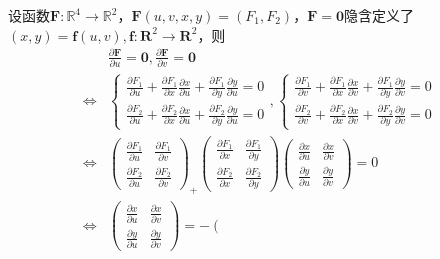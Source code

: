 \documentclass[main.tex]{subfiles}
\begin{document}
\begin{example}\label{exp:II.12.2}
设函数$\mathbf{F}:\mathbb{R}^4\rightarrow\mathbb{R}^2$，$\mathbf{F}\left(u,v,x,y\right)=\left(F_1,F_2\right)$，$\mathbf{F}=\mathbf{0}$隐含定义了$\left(x,y\right)=\mathbf{f}\left(u,v\right),\mathbf{f}:\mathbf{R}^2\rightarrow\mathbf{R}^2$，则
\begin{align*}
    &\frac{\partial \mathbf{F}}{\partial u}=\mathbf{0},\frac{\partial \mathbf{F}}{\partial v}=\mathbf{0}\\
    \Leftrightarrow&\left\{\begin{array}{l}
    \frac{\partial F_1}{\partial u}+\frac{\partial F_1}{\partial x}\frac{\partial x}{\partial u}+\frac{\partial F_1}{\partial y}\frac{\partial y}{\partial u}=0\\
    \frac{\partial F_2}{\partial u}+\frac{\partial F_2}{\partial x}\frac{\partial x}{\partial u}+\frac{\partial F_2}{\partial y}\frac{\partial y}{\partial u}=0
    \end{array}\right.,\left\{\begin{array}{l}
    \frac{\partial F_1}{\partial v}+\frac{\partial F_1}{\partial x}\frac{\partial x}{\partial v}+\frac{\partial F_1}{\partial y}\frac{\partial y}{\partial v}=0\\
    \frac{\partial F_2}{\partial v}+\frac{\partial F_2}{\partial x}\frac{\partial x}{\partial v}+\frac{\partial F_2}{\partial y}\frac{\partial y}{\partial v}=0
    \end{array}\right.\\
    \Leftrightarrow&\left(\begin{array}{cc}
    \frac{\partial F_1}{\partial u}&\frac{\partial F_1}{\partial v}\\\frac{\partial F_2}{\partial u}&\frac{\partial F_2}{\partial v}\end{array}\right)_+\left(\begin{array}{cc}
    \frac{\partial F_1}{\partial x}&\frac{\partial F_1}{\partial y}\\\frac{\partial F_2}{\partial x}&\frac{\partial F_2}{\partial y}\end{array}\right)\left(\begin{array}{cc}
    \frac{\partial x}{\partial u}&\frac{\partial x}{\partial v}\\\frac{\partial y}{\partial u}&\frac{\partial y}{\partial v}\end{array}\right)=0\\
    \Leftrightarrow&\left(\begin{array}{cc}
    \frac{\partial x}{\partial u}&\frac{\partial x}{\partial v}\\\frac{\partial y}{\partial u}&\frac{\partial y}{\partial v}\end{array}\right)=-\left(\begin{array}{cc}

\end{array}
\end{align*}
\end{example}
\end{document}
